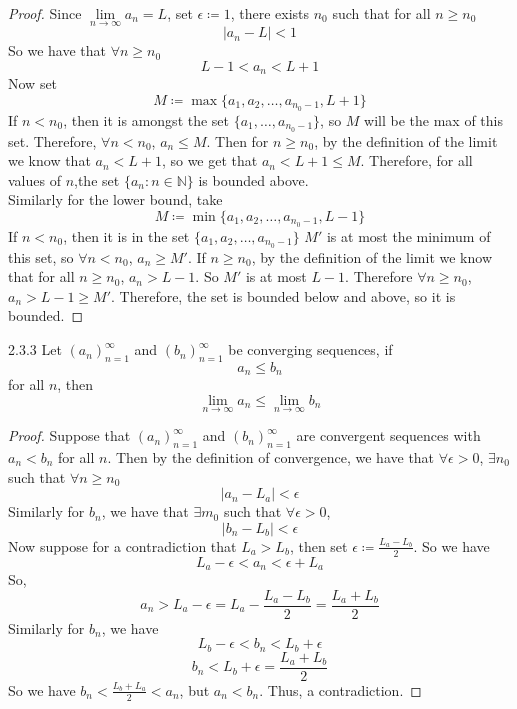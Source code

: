 \documentclass[openany]{report}
\begin{document}
    \begin{proof}
        Since $\lim\limits_{n\rightarrow\infty} a_n = L$, set $\epsilon \coloneqq 1$, there exists $n_0$ such that for all $n \geq n_0$
        \[|a_n - L| < 1\]
        So we have that $\forall n \geq n_0$
        \[L - 1 < a_n < L + 1\]
        Now set
        \[M \coloneqq \max\{a_1, a_2, \ldots, a_{n_0-1}, L+1\}\]
        If $n < n_0$, then it is amongst the set $\{a_1, \ldots, a_{n_0-1}\}$, so $M$ will be the max of this set. Therefore, $\forall n < n_0$, $a_n \leq M$. Then for $n \geq n_0$, by the definition of the limit we know that $a_n < L + 1$, so we get that $a_n < L + 1 \leq M$. Therefore, for all values of $n$,the set $\{a_n: n \in \mathbb{N}\}$ is bounded above.\\[1ex]
        Similarly for the lower bound, take
        \[M \coloneqq \min\{a_1, a_2, \ldots, a_{n_0 -1}, L - 1\}\]
        If $n < n_0$, then it is in the set $\{a_1, a_2, \ldots, a_{n_0-1}\}$
        $M'$ is at most the minimum of this set, so $\forall n < n_0$, $a_n \geq M'$. If $n \geq n_0$, by the definition of the limit we know that for all $n \geq n_0$, $a_n > L - 1$. So $M'$ is at most $L - 1$. Therefore $\forall n \geq n_0$, $a_n > L - 1 \geq M'$. Therefore, the set is bounded below and above, so it is bounded.
    \end{proof}
    \begin{manualprop}{2.3.3}
        Let $(a_n)_{n=1}^\infty$ and $(b_n)_{n=1}^\infty$ be converging sequences, if
        \[a_n \leq b_n\]
        for all $n$, then
        \[\lim_{n\rightarrow \infty} a_n \leq \lim_{n\rightarrow\infty} b_n   \]
    \end{manualprop}
    \begin{proof}
        Suppose that $(a_n)_{n=1}^\infty$ and $(b_n)_{n=1}^\infty$ are convergent sequences with $a_n < b_n$ for all $n$. Then by the definition of convergence, we have that $\forall \epsilon > 0$, $\exists n_0$ such that $\forall n \geq n_0$
        \[|a_n - L_a| < \epsilon\]
        Similarly for $b_n$, we have that $\exists m_0$ such that $\forall \epsilon > 0$, 
        \[|b_n - L_b| < \epsilon\]
        Now suppose for a contradiction that $L_a > L_b$, then set $\epsilon \coloneqq \frac{L_a - L_b}{2}$. So we have 
        \[L_a-\epsilon < a_n < \epsilon + L_a\]
        So,
        \[a_n > L_a - \epsilon = L_a - \frac{L_a - L_b}{2} = \frac{L_a + L_b}{2}\]
        Similarly for $b_n$, we have 
        \[L_b - \epsilon < b_n < L_b + \epsilon\]
        \[b_n < L_b + \epsilon = \frac{L_a + L_b}{2}\]
        So we have $b_n < \frac{L_b+L_a}{2} < a_n$, but $a_n < b_n$. Thus, a contradiction.
    \end{proof}
\end{document}

